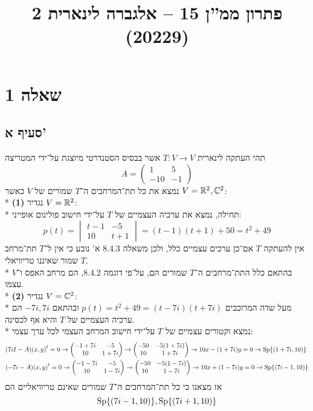 
\title{פתרון ממ''ן 15 – אלגברה לינארית 2 (20229)}


\maketitle
\maketitleprint{}

\section{שאלה 1}
\subsection{סעיף א'}
תהי העתקה לינארית $T : V \to V$ אשר בבסיס הסטנדרטי מיוצגת על־ידי המטריצה
\[
	A = \begin{pmatrix}
		1 & 5 \\
		-10 & -1
	\end{pmatrix}
\]
נמצא את כל תת־המרחבים ה־$T$ שמורים של $V$ כאשר $V = \mathbb{R}^2, \mathbb{C}^2$: \\*
\textbf{(1)}
נגדיר $V = \mathbb{R}^2$: \\*
תחילה, נמצא את ערכיה העצמיים של $T$ על־ידי חישוב פולינום אופייני:
\[
	p(t) = \begin{vmatrix}
		t - 1 & -5 \\
		10 & t + 1
	\end{vmatrix}
	= (t - 1)(t + 1) + 50
	= t^2 + 49
\]
אין להעתקה $T$ אם־כן ערכים עצמיים כלל, ולכן משאלה 8.4.3 א' נובע כי אין ל־$T$ תת־מרחב $T$ שמור שאיננו טריוויאלי. \\*
בהתאם כלל התת־מרחבים ה־$T$ שמורים הם, על־פי דוגמה 8.4.2, הם מרחב האפס ו־$V$ עצמו. \\*
\textbf{(2)}
נגדיר $V = \mathbb{C}^2$: \\*
מעל שדה המרוכבים $p(t) = t^2 + 49 = (t - 7i)(t + 7i)$ ובהתאם $-7i, 7i$ הם ערכיה העצמיים של $T$ והיא אף לכסינה. \\*
נמצא וקטורים עצמיים של $T$ על־ידי חישוב המרחב העצמי לכל ערך עצמי:
\begin{align*}
	& (7i I - A) {(x, y)}^t = 0 \rightarrow
	\begin{pmatrix}
		-1 + 7i & -5 \\
		10 & 1 + 7i
	\end{pmatrix}
	\rightarrow
	\begin{pmatrix}
		-50 & -5(1 + 7i) \\
		10 & 1 + 7i
	\end{pmatrix}
	\rightarrow
	10x - (1 + 7i)y = 0
	\rightarrow
	\operatorname{Sp}\{ (1 + 7i, 10) \} \\
	& (-7i - A) {(x, y)}^t = 0
	\rightarrow
	\begin{pmatrix}
		-1 -7i & -5 \\
		10 & 1 - 7i
	\end{pmatrix}
	\rightarrow
	\begin{pmatrix}
		-50 & -5(1 - 7i) \\
		10 & 1 - 7i
	\end{pmatrix}
	\rightarrow
	10x + (1 - 7i)y = 0
	\rightarrow
	\operatorname{Sp}\{ (7i - 1, 10) \}
\end{align*}
אז מצאנו כי כל תת־המרחבים ה־$T$ שמורים שאינם טריוויאליים הם
\[
	\operatorname{Sp}\{ (7i - 1, 10) \},
	\operatorname{Sp}\{ (7i + 1, 10) \}
\]


